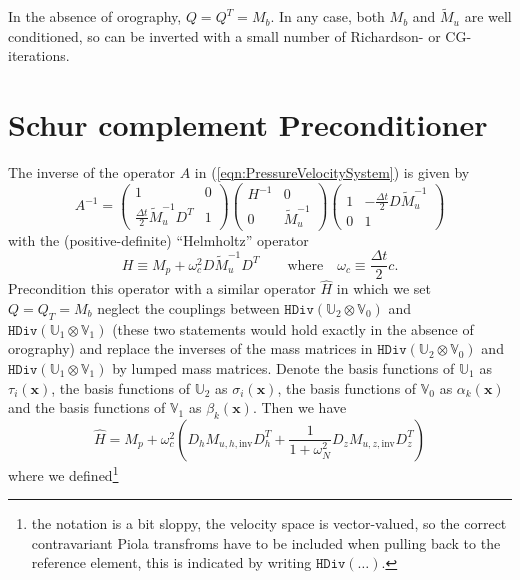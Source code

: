 \documentclass[10pt]{article}
\newcommand{\Uspace}{\mathbb{U}}
\newcommand{\Vspace}{\mathbb{V}}
\newcommand{\Hdiv}{\texttt{HDiv}}
\renewcommand{\vec}[1]{\boldsymbol{#1}}
\begin{document}
In the absence of orography, $Q=Q^T=M_b$. In any case, both $M_b$ and $\tilde{M}_u$ are well conditioned, so can be inverted with a small number of Richardson- or CG- iterations.
\section{Schur complement Preconditioner}
The inverse of the operator $A$ in (\ref{eqn:PressureVelocitySystem}) is given by
\begin{equation}
  A^{-1} = 
\begin{pmatrix}
  1 & 0 \\[1ex]
  \frac{\Delta t}{2}\tilde{M}_u^{-1} D^T & 1
\end{pmatrix}
\begin{pmatrix}
  H^{-1} & 0 \\[1ex] 0 & \tilde{M}_u^{-1}
\end{pmatrix}
\begin{pmatrix}
  1 & -\frac{\Delta t}{2}D\tilde{M}_u^{-1} \\[1ex]
  0 & 1
\end{pmatrix}
\end{equation}
with the (positive-definite) ``Helmholtz'' operator
\begin{equation}
  H \equiv M_p + \omega_c^2 D\tilde{M}_u^{-1} D^T
\qquad\text{where}\quad \omega_c \equiv \frac{\Delta t}{2}c.
\end{equation}
Precondition this operator with a similar operator $\hat{H}$ in which we set $Q=Q_T=M_b$ neglect the couplings between $\Hdiv(\Uspace_2\otimes\Vspace_0)$ and $\Hdiv(\Uspace_1\otimes\Vspace_1)$ (these two statements would hold exactly in the absence of orography) and replace the inverses of the mass matrices in $\Hdiv(\Uspace_2\otimes\Vspace_0)$ and $\Hdiv(\Uspace_1\otimes\Vspace_1)$ by lumped mass matrices. Denote the basis functions of $\Uspace_1$ as $\tau_i(\vec{x})$, the basis functions of $\Uspace_2$ as $\sigma_i(\vec{x})$, the basis functions of $\Vspace_0$ as $\alpha_k(\vec{x})$ and the basis functions of $\Vspace_1$ as $\beta_k(\vec{x})$. Then we have
\begin{equation}
  \hat{H} = M_{p} + \omega_c^2\left(
  D_h M_{u,h,\text{inv}} D_h^T +
\frac{1}{1+\omega_N^2}D_z M_{u,z,\text{inv}} D_z^T\right)
\label{eqn:Preconditioner}
\end{equation}
where we defined\footnote{the notation is a bit sloppy, the velocity space is vector-valued, so the correct contravariant Piola transfroms have to be included when pulling back to the reference element, this is indicated by writing $\Hdiv(\dots)$.}
\end{document}
